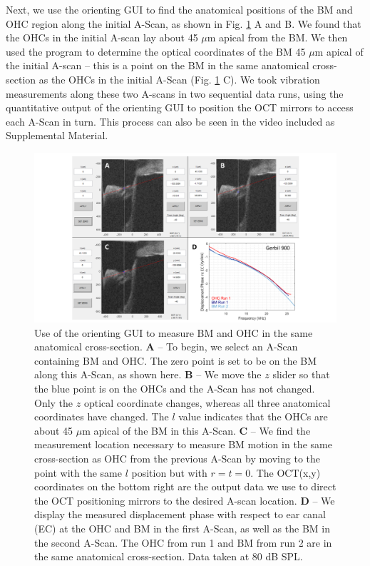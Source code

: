 \documentclass[preprint,NumberedRefs]{JASA}
\begin{document}
\par{Next, we use the orienting GUI to find the anatomical positions of the BM and OHC region along the initial A-Scan, as shown in Fig. \ref{process} A and B.  We found that the OHCs in the initial A-scan lay about 45 $\mu$m apical from the BM. We then used the program to determine the optical coordinates of the BM 45 $\mu$m apical of the initial A-scan -- this is a point on the BM in the same anatomical cross-section as the OHCs in the initial A-Scan (Fig. \ref{process} C). We took vibration measurements along these two A-scans in two sequential data runs, using the quantitative output of the orienting GUI to position the OCT mirrors to access each A-Scan in turn. This process can also be seen in the video included as Supplemental Material.}

\begin{figure}[h!]
    \centering
    \includegraphics[width=\textwidth]{Figure6.pdf}
    \caption{Use of the orienting GUI to measure BM and OHC in the same anatomical cross-section. \textbf{A} -- To begin, we select an A-Scan containing BM and OHC. The zero point is set to be on the BM along this A-Scan, as shown here. \textbf{B} -- We move the $z$ slider so that the blue point is on the OHCs and the A-Scan has not changed. Only the $z$ optical coordinate changes, whereas all three anatomical coordinates have changed. The $l$ value indicates that the OHCs are about 45 $\mu$m apical of the BM in this A-Scan. \textbf{C} -- We find the measurement location necessary to measure BM motion in the same cross-section as OHC from the previous A-Scan by moving to the point with the same $l$ position but with $r=t=0$. The OCT(x,y) coordinates on the bottom right are the output data we use to direct the OCT positioning mirrors to the desired A-scan location.  \textbf{D} -- We display the measured displacement phase with respect to ear canal (EC) at the OHC and BM in the first A-Scan, as well as the BM in the second A-Scan. The OHC from run 1 and BM from run 2 are in the same anatomical cross-section.  Data taken at 80 dB SPL.}
    \label{process}
\end{figure}
\end{document}
